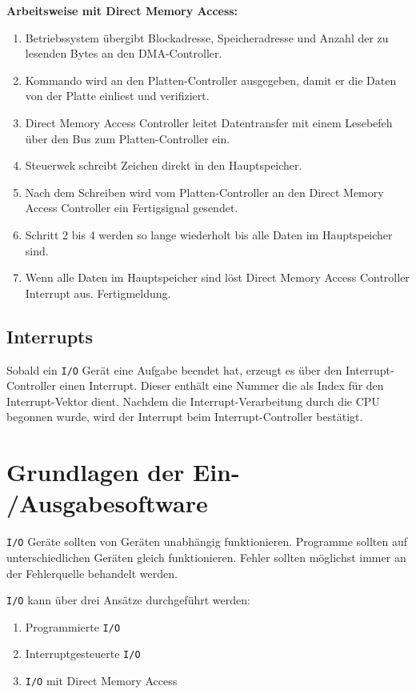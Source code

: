 \textbf{Arbeitsweise mit Direct Memory Access:}

\begin{enumerate}
    \item Betriebssystem übergibt Blockadresse, Speicheradresse und Anzahl der zu
          lesenden Bytes an den DMA-Controller.
    \item Kommando wird an den Platten-Controller ausgegeben, damit er die Daten von der
          Platte einliest und verifiziert.
    \item Direct Memory Access Controller leitet Datentransfer mit einem Lesebefeh über
          den Bus zum Platten-Controller ein.
    \item Steuerwek schreibt Zeichen direkt in den Hauptspeicher.
    \item Nach dem Schreiben wird vom Platten-Controller an den Direct Memory Access
          Controller ein Fertigsignal gesendet.
    \item Schritt 2 bis 4 werden so lange wiederholt bis alle Daten im Hauptspeicher
          sind.
    \item Wenn alle Daten im Hauptspeicher sind löst Direct Memory Access Controller
          Interrupt aus. Fertigmeldung.
\end{enumerate}

\subsection{Interrupts}

Sobald ein \texttt{I/O} Gerät eine Aufgabe beendet hat, erzeugt es über den
Interrupt-Controller einen Interrupt. Dieser enthält eine Nummer die als Index
für den Interrupt-Vektor dient. Nachdem die Interrupt-Verarbeitung durch die
CPU begonnen wurde, wird der Interrupt beim Interrupt-Controller bestätigt.

\section{Grundlagen der Ein- /Ausgabesoftware}

\texttt{I/O} Geräte sollten von Geräten unabhängig funktionieren. Programme sollten auf unterschiedlichen Geräten gleich funktionieren. Fehler sollten möglichst immer an der Fehlerquelle behandelt werden.

\texttt{I/O} kann über drei Ansätze durchgeführt werden:

\begin{enumerate}
    \item Programmierte \texttt{I/O}
    \item Interruptgesteuerte \texttt{I/O}
    \item \texttt{I/O} mit Direct Memory Access
\end{enumerate}

